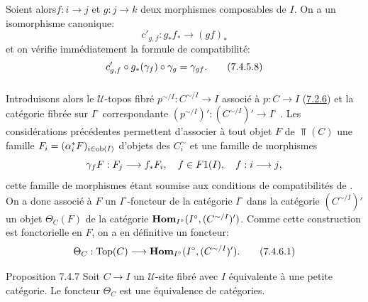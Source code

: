 \documentclass[10pt]{../fichiers-configuration-latex/smfart}
\begin{document}
Soient alors\pageoriginale $f : i \to j$ et $g : j \to k$ deux morphismes
composables de $I$. On a un isomorphisme canonique:
$$
c'_{g, f} : g_{\ast} f_{\ast} \to (gf)_{\ast}
$$
et on vérifie immédiatement la formule de compatibilité:
\begin{equation*}
c'_{g, f} \circ g_{\ast} (\gamma_f) \circ \gamma_g =
\gamma_{gf}{}.\tag{7.4.5.8}
\end{equation*}

\subsubsection{}

Introduisons alors le $𝒰$-topos fibré $p^{\sim/I} : C^{\sim/I} \to I$
associé à $p : C \to I$ (\hyperref[VI.subsubsec7.2.6]{7.2.6}) et la catégorie fibrée sur $I^{\circ}$
correspondante $(p^{\sim/I})' :(C^{\sim/I})'\to I^{\circ}$ . Les
considérations précédentes permettent d'associer à tout objet $F$ de
$\Top(C)$ une famille $F_i = (\alpha^{\ast}_i F)_{i \in \operatorname{ob} (I)}$
d'objets des $C^{\sim}_i$ et une famille de morphismes
$$
\gamma_f F : F_j \to f_{\ast} F_i,\quad f\in F1(I),\quad f : i \to j{\quoi},
$$
cette famille de morphismes étant soumise aux conditions de
compatibilités de . On a donc associé à $F$ un
$I^{\circ}$-foncteur de la catégorie $I^{\circ}$ dans la catégorie
$(C^{\sim/I})'$ \ie un objet $\Theta_C (F)$ de la catégorie
$\operatorname{\mathbf{Hom}}_{I^{\circ}} (I^{\circ}, (C^{\sim/I})')$. Comme cette
construction est fonctorielle en $F$, on a en définitive un foncteur:
\begin{equation*}
\Theta_C : \Top(C) \to \Hhom_{I^{\circ}} (I^{\circ},
(C^{\sim/I})'){\quoi}.\tag{7.4.6.1}
\end{equation*}

\begin{enonce*}{Proposition 7.4.7}
Soit $C \to I$ un $\mathcal{U}$-site fibré avec $I$ équivalente à une
petite catégorie. Le foncteur $\Theta_C$  est une équivalence
de catégories.
\end{enonce*}
\end{document}
